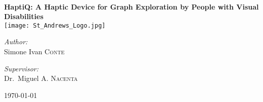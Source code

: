 
\begin{titlepage}
\begin{center}


\HRule \\[0.4cm]
{ \huge \bfseries HaptiQ: A Haptic Device for Graph Exploration by People with Visual Disabilities }
\HRule \\[0.4cm]

\texttt{[image: St\_Andrews\_Logo.jpg]} %

\begin{minipage}{0.4\textwidth}
\begin{flushleft} \large
\emph{Author:}\\
Simone Ivan \textsc{Conte}
\end{flushleft}
\end{minipage}
\begin{minipage}{0.4\textwidth}
\begin{flushright} \large
\emph{Supervisor:} \\
Dr.~Miguel A. \textsc{Nacenta}
\end{flushright}
\end{minipage}

\vfill

{\large \today}

\end{center}
\end{titlepage}